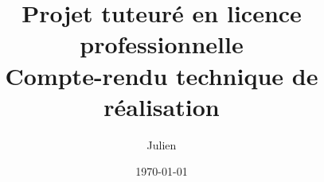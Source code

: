 \documentclass[10pt]{report}
\title{Projet tuteuré en licence professionnelle\\Compte-rendu technique de réalisation}
\author{Julien \bsc{Rosset}}
\date{\today}
\begin{document}
	

	

	\renewcommand{\contentsname}{Sommaire}
	\tableofcontents

	

	
	
	

	

	\appendix
	
\end{document}
